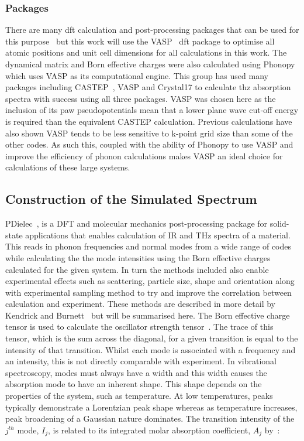 \subsubsection{Packages}
There are many \acrshort{dft} calculation and post-processing packages that can be used for this purpose~\cite{Clark2005, Gale2011, dovesi2020crystal} but this work will use the VASP~\cite{Hafner2008} \acrshort{dft} package to optimise all atomic positions and unit cell dimensions for all calculations in this work. The dynamical matrix and Born effective charges were also calculated using Phonopy~\cite{Togo2015} which uses VASP as its computational engine. This group has used many packages including CASTEP~\cite{Clark2005}, VASP and Crystal17 to calculate \acrshort{thz} absorption spectra with success using all three packages. VASP was chosen here as the inclusion of its \acrshort{paw} pseudopotentials mean that a lower plane wave cut\nobreakdash-off energy is required than the equivalent CASTEP calculation. Previous calculations have also shown VASP tends to be less sensitive to k\nobreakdash-point grid size than some of the other codes. As such this, coupled with the ability of Phonopy to use VASP and improve the efficiency of phonon calculations makes VASP an ideal choice for calculations of these large systems.

\subsection{Construction of the Simulated Spectrum}
\label{subsec:pdielec}
PDielec~\cite{Kendrick2016}, is a DFT and molecular mechanics post\nobreakdash-processing package for solid\nobreakdash-state applications that enables calculation of IR and THz spectra of a material. This reads in phonon frequencies and normal modes from a wide range of codes while calculating the the mode intensities using the Born effective charges calculated for the given system. In turn the methods included also enable experimental effects such as scattering, particle size, shape and orientation along with experimental sampling method to try and improve the correlation between calculation and experiment. These methods are described in more detail by Kendrick and Burnett~\cite{Kendrick2016, Kendrick2020, john_kendrick_2022_5888313} but will be summarised here. The Born effective charge tensor is used to calculate the oscillator strength tensor~\cite{Gonze1997}. The trace of this tensor, which is the sum across the diagonal, for a given transition is equal to the intensity of that transition.
Whilst each mode is associated with a frequency and an intensity, this is not directly comparable with experiment. In vibrational spectroscopy, modes must always have a width and this width causes the absorption mode to have an inherent shape. This shape depends on the properties of the system, such as temperature. At low temperatures, peaks typically demonstrate a Lorentzian peak shape whereas as temperature increases, peak broadening of a Gaussian nature dominates. The transition intensity of the \(j^{th}\) mode, \(I_j\), is related to its integrated molar absorption coefficient, \(A_j\) by~\cite{Wilson1955}:

